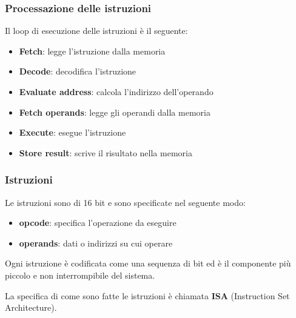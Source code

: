 \documentclass[a4paper]{article}
\theoremstyle{break}
\theoremstyle{break}
\theoremstyle{break}
\theoremstyle{break}
\begin{document}
\subsubsection{Processazione delle istruzioni}
Il loop di esecuzione delle istruzioni è il seguente:
\begin{itemize}
	\item \textbf{Fetch}: legge l'istruzione dalla memoria
	\item \textbf{Decode}: decodifica l'istruzione
	\item \textbf{Evaluate address}: calcola l'indirizzo dell'operando
	\item \textbf{Fetch operands}: legge gli operandi dalla memoria
	\item \textbf{Execute}: esegue l'istruzione
	\item \textbf{Store result}: scrive il risultato nella memoria
\end{itemize}

\subsubsection{Istruzioni}
Le istruzioni sono di 16 bit e sono specificate nel seguente modo:
\begin{itemize}
	\item \textbf{opcode}: specifica l'operazione da eseguire
	\item \textbf{operands}: dati o indirizzi su cui operare
\end{itemize}
Ogni istruzione è codificata come una sequenza di bit ed è il componente più piccolo
e non interrompibile del sistema.

\vspace{1em}
\noindent La specifica di come sono fatte le istruzioni è chiamata \textbf{ISA}
(Instruction Set Architecture).
\end{document}
